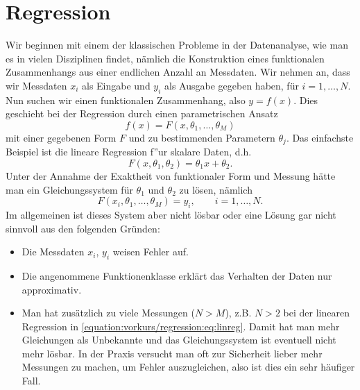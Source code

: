 \section{Regression}
\label{\detokenize{vorkurs/regression:regression}}\label{\detokenize{vorkurs/regression::doc}}
Wir beginnen mit einem der klassischen Probleme in der Datenanalyse, wie man es in vielen Disziplinen findet, nämlich die Konstruktion eines funktionalen Zusammenhangs aus einer endlichen Anzahl an Messdaten. Wir nehmen an, dass
wir Messdaten \(x_i\) als Eingabe und \(y_i\) als Ausgabe gegeben haben, für \(i=1,\ldots, N\). Nun suchen wir einen funktionalen Zusammenhang, also \(y=f(x)\). Dies geschieht bei der Regression durch einen parametrischen Ansatz
\begin{equation*}
 f(x) = F(x,\theta_1,\ldots,\theta_M)\end{equation*}
mit einer gegebenen Form \(F\) und   zu bestimmenden Parametern \(\theta_j\). Das einfachste Beispiel ist die lineare Regression f”ur skalare Daten, d.h.
\begin{equation}\label{equation:vorkurs/regression:eq:linreg}
F(x,\theta_1,\theta_2) = \theta_1 x + \theta_2 .
\end{equation}
Unter der Annahme der Exaktheit von funktionaler Form und Messung hätte man ein Gleichungssystem für \(\theta_1\) und \(\theta_2\) zu lösen, nämlich
\begin{equation}\label{equation:vorkurs/regression:eq:nonlinreg}
 F(x_i,\theta_1,\ldots,\theta_M) = y_i, \qquad i=1,\ldots,N. 
\end{equation}
Im allgemeinen ist dieses System aber nicht lösbar oder eine Lösung gar nicht sinnvoll aus den folgenden Gründen:
\begin{itemize}
\item {} 
Die Messdaten \(x_i\), \(y_i\) weisen Fehler auf.

\item {} 
Die angenommene Funktionenklasse erklärt das Verhalten der Daten nur approximativ.

\item {} 
Man hat zusätzlich zu viele Messungen (\(N > M\)), z.B. \(N > 2\) bei der linearen Regression in \eqref{equation:vorkurs/regression:eq:linreg}. Damit hat man mehr Gleichungen als Unbekannte und das Gleichungssystem ist eventuell nicht mehr lösbar. In der Praxis versucht man oft zur Sicherheit lieber mehr Messungen zu machen, um Fehler auszugleichen, also ist dies ein sehr häufiger Fall.

\end{itemize}


